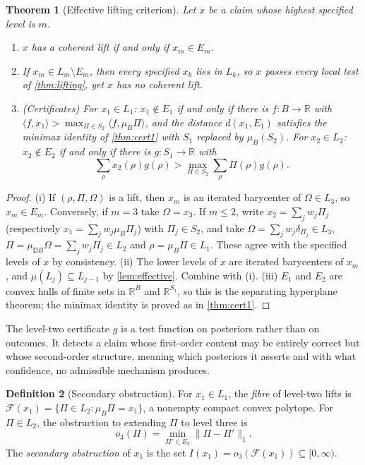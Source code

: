 \documentclass[11pt]{article}
\newtheorem{theorem}{Theorem}[section]
\theoremstyle{definition}
\newtheorem{definition}[theorem]{Definition}
\theoremstyle{remark}
\newcommand{\D}{\mathsf{D}}
\begin{document}
\begin{theorem}[Effective lifting criterion]\label{thm:eff-lift}
Let $x$ be a claim whose highest specified level is $m$.
\begin{enumerate}[label=(\roman*)]
\item $x$ has a coherent lift if and only if $x_m\in E_m$.
\item If $x_m\in L_m\setminus E_m$, then every specified $x_k$ lies in $L_k$, so $x$ passes every
  local test of \cref{thm:lifting}, yet $x$ has no coherent lift.
\item (Certificates) For $x_1\in L_1$: $x_1\notin E_1$ if and only if there is $f\colon B\to\mathbb{R}$
  with $\langle f,x_1\rangle>\max_{\Pi\in S_2}\langle f,\mu_B\Pi\rangle$, and the distance
  $d(x_1,E_1)$ satisfies the minimax identity of \cref{thm:cert1} with $S_1$ replaced by $\mu_B(S_2)$.
  For $x_2\in L_2$: $x_2\notin E_2$ if and only if there is $g\colon S_1\to\mathbb{R}$ with
  \[
  \textstyle\sum_\rho x_2(\rho)g(\rho)>\max_{\Pi\in S_2}\sum_\rho\Pi(\rho)g(\rho).
  \]
\end{enumerate}
\end{theorem}
\begin{proof}
(i) If $(\rho,\Pi,\Omega)$ is a lift, then $x_m$ is an iterated barycenter of $\Omega\in L_3$, so
$x_m\in E_m$. Conversely, if $m=3$ take $\Omega=x_3$. If $m\le2$, write $x_2=\sum_jw_j\Pi_j$
(respectively $x_1=\sum_jw_j\mu_B\Pi_j$) with $\Pi_j\in S_2$, and take $\Omega=\sum_jw_j\delta_{\Pi_j}
\in L_3$, $\Pi=\mu_{\D B}\Omega=\sum_jw_j\Pi_j\in L_2$ and $\rho=\mu_B\Pi\in L_1$. These agree with the
specified levels of $x$ by consistency.
(ii) The lower levels of $x$ are iterated barycenters of $x_m$, and $\mu(L_j)\subseteq L_{j-1}$ by
\cref{lem:effective}. Combine with (i).
(iii) $E_1$ and $E_2$ are convex hulls of finite sets in $\mathbb{R}^B$ and $\mathbb{R}^{S_1}$, so this
is the separating hyperplane theorem; the minimax identity is proved as in \cref{thm:cert1}.
\end{proof}

The level-two certificate $g$ is a test function on posteriors rather than on outcomes. It detects a
claim whose first-order content may be entirely correct but whose second-order structure, meaning
which posteriors it asserts and with what confidence, no admissible mechanism produces.

\begin{definition}[Secondary obstruction]\label{def:secondary}
For $x_1\in L_1$, the \emph{fibre} of level-two lifts is $\mathcal{F}(x_1)=\{\Pi\in L_2:\mu_B\Pi=x_1\}$,
a nonempty compact convex polytope. For $\Pi\in L_2$, the obstruction to extending $\Pi$ to level three
is
\[
o_3(\Pi)=\min_{\Pi'\in E_2}\lVert\Pi-\Pi'\rVert_1 .
\]
The \emph{secondary obstruction} of $x_1$ is the set $I(x_1)=o_3(\mathcal{F}(x_1))\subseteq[0,\infty)$.
\end{definition}
\end{document}
